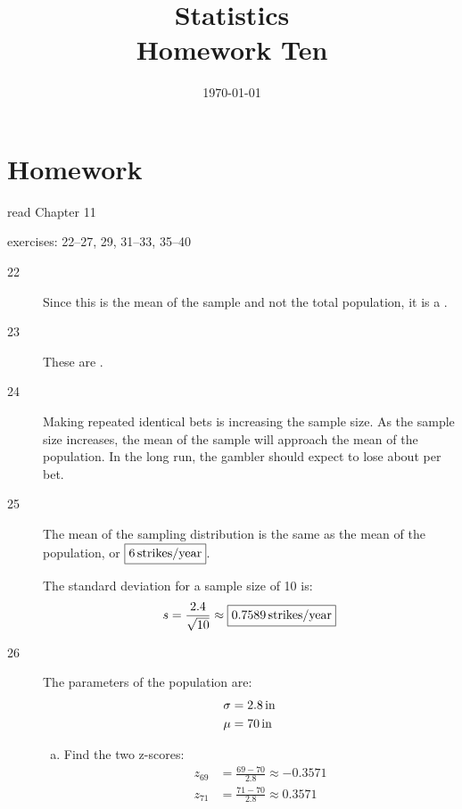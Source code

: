 \documentclass[letterpaper]{exam}
\title{Statistics \\ Homework Ten}
\date{\today}
\author{}
\newcommand{\cent}{\textcent\xspace}
\begin{document}
  \maketitle

  \section{Homework}
  \ifprintanswers{}
  \else
    \begin{itemize*}
      \item read Chapter 11 
      \item exercises: 22--27, 29, 31--33, 35--40
    \end{itemize*}
  \fi

  \ifprintanswers{}
    \begin{description}

      \item[22] Since this is the mean of the sample and not the total
        population, it is a .

      \item[23] These are .

      \item[24] Making repeated identical bets is increasing the sample size.
        As the sample size increases, the mean of the sample will approach the
        mean of the population. In the long run, the gambler should expect to
        lose about \fbox{ 5.3\cent{} } per bet.

      \item[25] The mean of the sampling distribution is the same as the mean of
        the population, or $\boxed{ \unit[6]{strikes/year} }$.

        The standard deviation for a sample size of 10 is:
        \[
          s = \frac{2.4}{\sqrt{10}} \approx \boxed{ \unit[0.7589]{strikes/year} }
        \]

      \item[26]
        The parameters of the population are:
        \begin{align*}
          \sigma & = \unit[2.8]{in} \\
          \mu    & = \unit[70]{in} \\
        \end{align*}

        \begin{enumerate}[(a)]
          \item Find the two z-scores:
            \begin{align*}
              z_{69} &= \frac{69 - 70}{2.8} \approx -0.3571 \\
              z_{71} &= \frac{71 - 70}{2.8} \approx 0.3571 \\
            \end{align*}


\end{enumerate}
\end{description}
\end{document}
